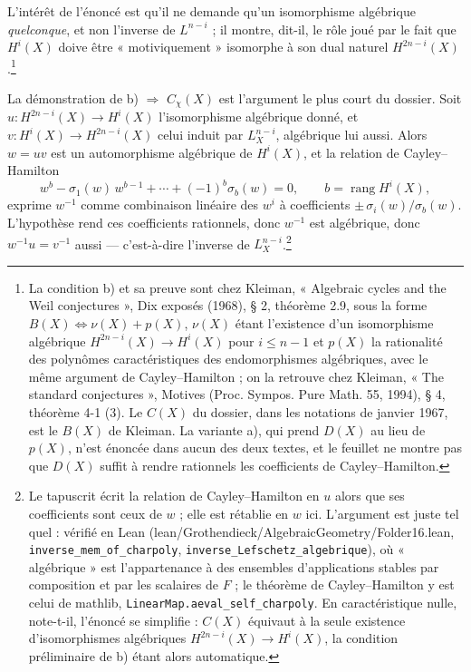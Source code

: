 \documentclass[11pt,a4paper]{article}
\begin{document}
L'intérêt de l'énoncé est qu'il ne demande qu'un isomorphisme algébrique
\emph{quelconque}, et non l'inverse de $L^{n-i}$ ; il montre, dit-il, le rôle
joué par le fait que $H^{i}(X)$ doive être « motiviquement » isomorphe à son
dual naturel $H^{2n-i}(X)$.\footnote{La condition b) et sa preuve sont chez
Kleiman, « Algebraic cycles and the Weil conjectures », Dix exposés (1968),
§ 2, théorème 2.9, sous la forme $B(X) \iff \nu(X) + p(X)$, $\nu(X)$ étant
l'existence d'un isomorphisme algébrique $H^{2n-i}(X) \to H^{i}(X)$ pour
$i \leqslant n-1$ et $p(X)$ la rationalité des polynômes caractéristiques des
endomorphismes algébriques, avec le même argument de Cayley--Hamilton ; on la
retrouve chez Kleiman, « The standard conjectures », Motives (Proc. Sympos.
Pure Math. 55, 1994), § 4, théorème 4-1 (3). Le $C(X)$ du dossier, dans les
notations de janvier 1967, est le $B(X)$ de Kleiman. La variante a), qui
prend $D(X)$ au lieu de $p(X)$, n'est énoncée dans aucun des deux textes, et
le feuillet ne montre pas que $D(X)$ suffit à rendre rationnels les
coefficients de Cayley--Hamilton.}

La démonstration de b) $\Rightarrow$ $C_{\chi}(X)$ est l'argument le plus court
du dossier. Soit $u \colon H^{2n-i}(X) \to H^{i}(X)$ l'isomorphisme algébrique
donné, et $v \colon H^{i}(X) \to H^{2n-i}(X)$ celui induit par $L_{X}^{n-i}$,
algébrique lui aussi. Alors $w = uv$ est un automorphisme algébrique de
$H^{i}(X)$, et la relation de Cayley--Hamilton
\[
w^{b} - \sigma_{1}(w)\,w^{b-1} + \cdots + (-1)^{b}\sigma_{b}(w) = 0,
\qquad b = \operatorname{rang} H^{i}(X),
\]
exprime $w^{-1}$ comme combinaison linéaire des $w^{i}$ à coefficients
$\pm\,\sigma_{i}(w)/\sigma_{b}(w)$. L'hypothèse rend ces coefficients
rationnels, donc $w^{-1}$ est algébrique, donc $w^{-1}u = v^{-1}$ aussi ---
c'est-à-dire l'inverse de $L_{X}^{n-i}$.\footnote{Le tapuscrit écrit la
relation de Cayley--Hamilton en $u$ alors que ses coefficients sont ceux de
$w$ ; elle est rétablie en $w$ ici. L'argument est juste tel quel : vérifié
en Lean (lean/Grothendieck/AlgebraicGeometry/Folder16.lean, \texttt{inverse\_mem\_of\_charpoly},
\texttt{inverse\_Lefschetz\_algebrique}), où « algébrique » est
l'appartenance à des ensembles d'applications stables par composition et par
les scalaires de $F$ ; le théorème de Cayley--Hamilton y est celui de mathlib,
\texttt{LinearMap.aeval\_self\_charpoly}. En caractéristique nulle, note-t-il,
l'énoncé se simplifie : $C(X)$ équivaut à la seule existence d'isomorphismes
algébriques $H^{2n-i}(X) \to H^{i}(X)$, la condition préliminaire de b) étant
alors automatique.}
\end{document}
